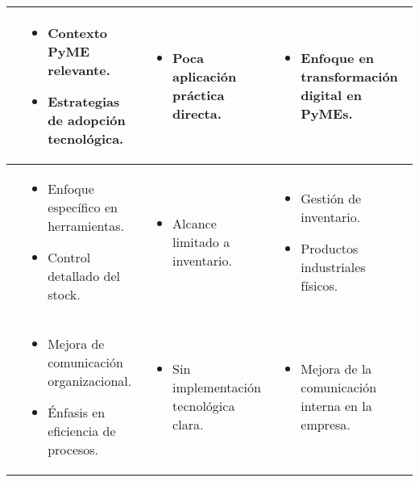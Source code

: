 \begin{longtable}{|p{}|p{}|p{}|p{}|}
    \cite{Rodeiro2012} &
    \begin{itemize}
        \item Contexto PyME relevante.
        \item Estrategias de adopción tecnológica.
    \end{itemize} &
    \begin{itemize}
        \item Poca aplicación práctica directa.
    \end{itemize} &
    \begin{itemize}
        \item Enfoque en transformación digital en PyMEs.
    \end{itemize} \\
    \hline
    
    \cite{Flores2015} &
    \begin{itemize}
        \item Enfoque específico en herramientas.
        \item Control detallado del stock.
    \end{itemize} &
    \begin{itemize}
        \item Alcance limitado a inventario.
    \end{itemize} &
    \begin{itemize}
        \item Gestión de inventario.
        \item Productos industriales físicos.
    \end{itemize} \\
    \hline
    
    \cite{Reyes2012} &
    \begin{itemize}
        \item Mejora de comunicación organizacional.
        \item Énfasis en eficiencia de procesos.
    \end{itemize} &
    \begin{itemize}
        \item Sin implementación tecnológica clara.
    \end{itemize} &
    \begin{itemize}
        \item Mejora de la comunicación interna en la empresa.
    \end{itemize} \\
    \hline
    

\end{longtable}
